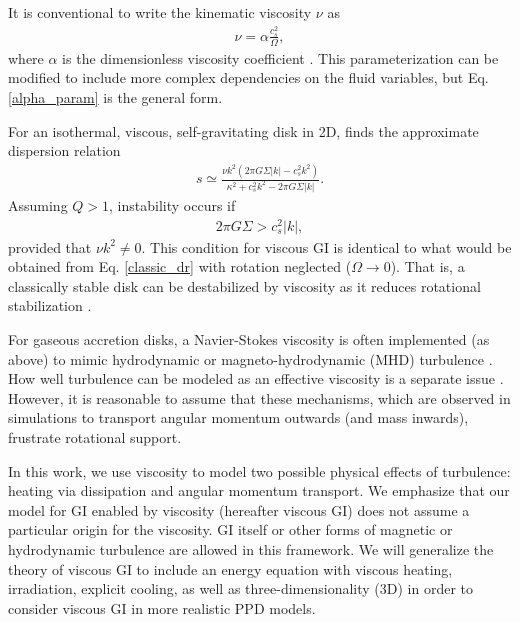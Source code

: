 \documentclass[iop, numberedappendix]{emulateapj}
\begin{document}
It is conventional to write the kinematic viscosity $\nu$ as   
\begin{align}\label{alpha_param}
  \nu  = \alpha \frac{c_s^2}{\Omega}, %
\end{align}
where $\alpha$ is the dimensionless viscosity
coefficient \cite{shakura73}. This
parameterization can be modified to include more complex dependencies on the
fluid variables, but Eq. \ref{alpha_param} is the general form. 

For an isothermal, viscous, self-gravitating disk in 2D,
\cite{gammie96} finds the approximate dispersion relation   
\begin{align}
s \simeq \frac{\nu k^2\left(2\pi G\Sigma |k| -
  c_s^2k^2\right)}{\kappa^2 + c_s^2k^2 - 2\pi G\Sigma|k|}. 
\end{align}
Assuming $Q>1$, instability occurs if 
\begin{align*}
  2\pi G \Sigma > c_s^2|k|,
\end{align*}
provided that $\nu k^2\neq0$. This condition for viscous GI is 
identical to what would be obtained from Eq. \ref{classic_dr} with
rotation neglected ($\Omega\to 0$). That is, a classically stable
disk can be destabilized by viscosity as it reduces 
rotational stabilization \citep{lynden-bell74}.  

For gaseous accretion disks, a Navier-Stokes viscosity is often
implemented (as above) to mimic hydrodynamic or magneto-hydrodynamic
(MHD) turbulence \citep{shakura73}. How well turbulence can be modeled
as an effective viscosity is a separate issue 
\citep{balbus99}. However, it is reasonable to assume that these
mechanisms, which are observed in simulations  
to transport angular momentum outwards (and mass inwards),
frustrate rotational support. 

In this work, we use viscosity to model two possible
physical effects of turbulence: heating via dissipation and angular momentum transport. 
We emphasize that our model for GI enabled by viscosity (hereafter
viscous GI) does not assume a particular origin for the viscosity. GI
itself or other forms of magnetic or hydrodynamic turbulence are 
allowed in this framework. We will generalize the theory of viscous GI
to include an energy equation  with viscous heating, irradiation,
explicit cooling, as well as three-dimensionality (3D) in order to
consider viscous GI in more realistic PPD models.   
\end{document}
